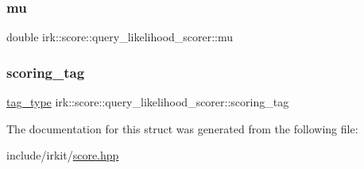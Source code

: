 \subsubsection{\texorpdfstring{mu}{mu}}
{\footnotesize\ttfamily double irk\+::score\+::query\+\_\+likelihood\+\_\+scorer\+::mu}

\mbox{\label{structirk_1_1score_1_1query__likelihood__scorer_ab0248969eb132cf91b9b6103d7d2568e}} 
\subsubsection{\texorpdfstring{scoring\+\_\+tag}{scoring\_tag}}
{\footnotesize\ttfamily \mbox{\hyperlink{structirk_1_1score_1_1query__likelihood__scorer_a4a7795fbd9f018d25bdc59c5ae001e2a}{tag\+\_\+type}} irk\+::score\+::query\+\_\+likelihood\+\_\+scorer\+::scoring\+\_\+tag}



The documentation for this struct was generated from the following file\+:\begin{DoxyCompactItemize}
\item 
include/irkit/\mbox{\hyperlink{score_8hpp}{score.\+hpp}}\end{DoxyCompactItemize}
